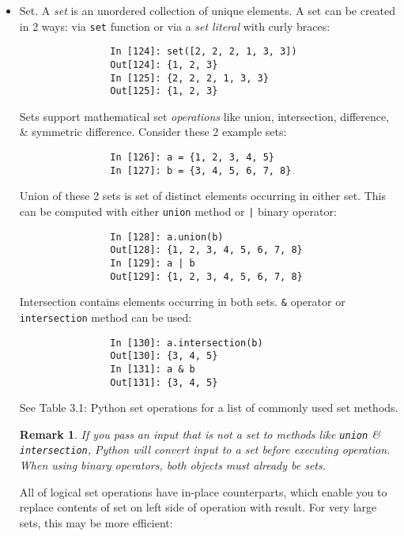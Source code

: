 \documentclass{article}
\newtheorem{remark}{Remark}
\begin{document}
\begin{itemize}
\begin{itemize}
\begin{itemize}
\begin{itemize}
				To use a list as a key, 1 option: convert it to a tuple, which can be hashed as long as its elements also can be:
				\begin{verbatim}
					In [121]: d = {}
					In [122]: d[tuple([1, 2, 3])] = 5
					In [123]: d
					Out[123]: {(1, 2, 3): 5}
				\end{verbatim}
			\end{itemize}
			\item {\sf Set.} A {\it set} is an unordered collection of unique elements. A set can be created in 2 ways: via {\tt set} function or via a {\it set literal} with curly braces:
			\begin{verbatim}
				In [124]: set([2, 2, 2, 1, 3, 3])
				Out[124]: {1, 2, 3}
				In [125]: {2, 2, 2, 1, 3, 3}
				Out[125]: {1, 2, 3}
			\end{verbatim}
			Sets support mathematical set {\it operations} like union, intersection, difference, \& symmetric difference. Consider these 2 example sets:
			\begin{verbatim}
				In [126]: a = {1, 2, 3, 4, 5}
				In [127]: b = {3, 4, 5, 6, 7, 8}
			\end{verbatim}
			Union of these 2 sets is set of distinct elements occurring in either set. This can be computed with either {\tt union} method or {\tt|} binary operator:
			\begin{verbatim}
				In [128]: a.union(b)
				Out[128]: {1, 2, 3, 4, 5, 6, 7, 8}
				In [129]: a | b
				Out[129]: {1, 2, 3, 4, 5, 6, 7, 8}
			\end{verbatim}
			Intersection contains elements occurring in both sets. {\tt\&} operator or {\tt intersection} method can be used:
			\begin{verbatim}
				In [130]: a.intersection(b)
				Out[130]: {3, 4, 5}
				In [131]: a & b
				Out[131]: {3, 4, 5}
			\end{verbatim}
			See {\sf Table 3.1: Python set operations} for a list of commonly used set methods.				
			\begin{remark}
				If you pass an input that is not a set to methods like {\tt union} \& {\tt intersection}, Python will convert input to a set before executing operation. When using binary operators, both objects must already be sets.
			\end{remark}
			All of logical set operations have in-place counterparts, which enable you to replace contents of set on left side of operation with result. For very large sets, this may be more efficient:
			\begin{verbatim}

\end{verbatim}
\end{itemize}
\end{itemize}
\end{itemize}
\end{document}
